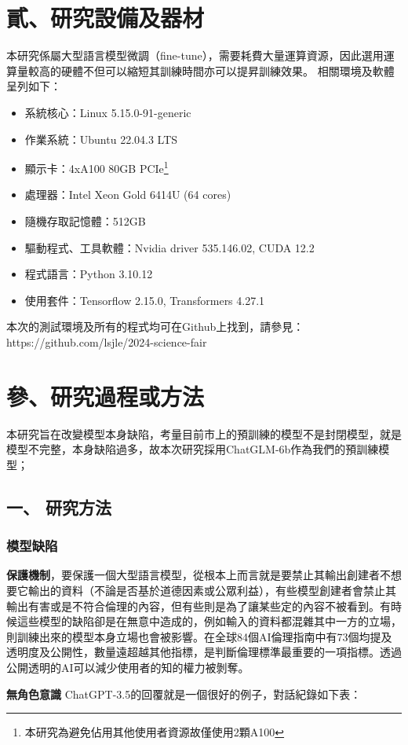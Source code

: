 \documentclass[8pt,a4paper,新細明體,UTF8,natbib]{article}
\begin{document}
\begin{CJK*}{UTF8}{bsmi}
	\section{貳、研究設備及器材}
	本研究係屬大型語言模型微調（fine-tune），需要耗費大量運算資源，因此選用運算量較高的硬體不但可以縮短其訓練時間亦可以提昇訓練效果。
	相關環境及軟體呈列如下：%
	\begin{itemize}
		\item 系統核心：Linux 5.15.0-91-generic
		\item 作業系統：Ubuntu 22.04.3 LTS
		\item 顯示卡：4xA100 80GB PCIe\footnote{本研究為避免佔用其他使用者資源故僅使用2顆A100}
		\item 處理器：Intel Xeon Gold 6414U (64 cores)
		\item 隨機存取記憶體：512GB
		\item 驅動程式、工具軟體：Nvidia driver 535.146.02, CUDA 12.2
		\item 程式語言：Python 3.10.12
		\item 使用套件：Tensorflow 2.15.0, Transformers 4.27.1
	\end{itemize}	
	本次的測試環境及所有的程式均可在Github上找到，請參見：https://github.com/lsjle/2024-science-fair
	\section{參、研究過程或方法}
	本研究旨在改變模型本身缺陷，考量目前市上的預訓練的模型不是封閉模型，就是模型不完整，本身缺陷過多，故本次研究採用ChatGLM-6b作為我們的預訓練模型；
	\subsection{一、 研究方法}
	\subsubsection{模型缺陷}
	\textbf{保護機制}，要保護一個大型語言模型，從根本上而言就是要禁止其輸出創建者不想要它輸出的資料（不論是否基於道德因素或公眾利益），有些模型創建者會禁止其輸出有害或是不符合倫理的內容，但有些則是為了讓某些定的內容不被看到。有時候這些模型的缺陷卻是在無意中造成的，例如輸入的資料都混雜其中一方的立場，則訓練出來的模型本身立場也會被影響。在全球84個AI倫理指南中有73個均提及透明度及公開性，數量遠超越其他指標，是判斷倫理標準最重要的一項指標。透過公開透明的AI可以減少使用者的知的權力被剝奪。\cite{Jobin2019}
	
	\textbf{無角色意識}
	ChatGPT-3.5的回覆就是一個很好的例子，對話紀錄如下表：


\end{CJK*}
\end{document}
